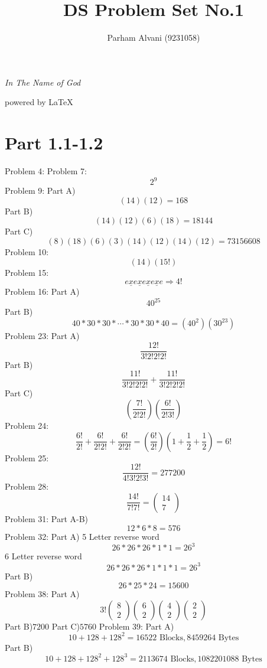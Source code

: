 \documentclass{article}
\title{DS Problem Set No.1}
\author{Parham Alvani (9231058)}
\begin{document}
\begin{titlepage}
\begin{center}
\emph{In The Name of God}
\end{center}
\maketitle
\begin{center}
powered by \LaTeX
\end{center}
\end{titlepage}
\tableofcontents
\newpage
\section{Part 1.1-1.2}
	Problem 4:
	Problem 7:
	$$
	2^9
	$$
	Problem 9: Part A)
	$$
	(14)(12)=168
	$$
	Part B)
	$$
	(14)(12)(6)(18)=18144
	$$
	Part C)
	$$
	(8)(18)(6)(3)(14)(12)(14)(12)=73156608
	$$
	Problem 10:
	$$
	(14)(15!)
	$$
	Problem 15:
	$$
	e\underline{x}e\underline{x}e\underline{x}e\underline{x}e
	\Rightarrow
	4!
	$$
	Problem 16: Part A)
	$$
	40^{25}
	$$
	Part B)
	$$
	40 * 30 * 30 * \cdots * 30 * 30 * 40 = (40^2)(30^{23})
	$$
	Problem 23: Part A)
	$$
	\frac{12!}{3!2!2!2!}
	$$
	Part B)
	$$
	\frac{11!}{3!2!2!2!}
	+
	\frac{11!}{3!2!2!2!}
	$$
	Part C)
	$$
	\left(
	\frac{7!}{2!2!}
	\right)
	\left(
	\frac{6!}{2!3!}
	\right)
	$$
	Problem 24:
	$$
	\frac{6!}{2!}
	+
	\frac{6!}{2!2!}
	+
	\frac{6!}{2!2!}
	=
	\left(
	\frac{6!}{2!}
	\right)
	\left(
	1
	+
	\frac{1}{2}
	+
	\frac{1}{2}
	\right)
	=6!
	$$
	Problem 25:
	$$
	\frac{12!}{4!3!2!3!}=277200
	$$
	Problem 28:
	$$
	\frac{14!}{7!7!}
	=
	\left(\begin{array}{c}
	14\\
	7
	\end{array}\right)	
	$$
	Problem 31:
	Part A-B)
	$$
	12*6*8=576	
	$$
	Problem 32: Part A) 5 Letter reverse word	
	$$
	26*26*26*1*1=26^3
	$$
	6 Letter reverse word
	$$
	26*26*26*1*1*1=26^3
	$$
	Part B)
	$$
	26*25*24=15600
	$$
	Problem 38: Part A)
	$$
	3!
	\left(\begin{array}{c}
	8\\
	2
	\end{array}\right)
	\left(\begin{array}{c}
	6\\
	2
	\end{array}\right)
	\left(\begin{array}{c}
	4\\
	2
	\end{array}\right)
	\left(\begin{array}{c}
	2\\
	2
	\end{array}\right)
	$$
	Part B)$ 7200 $
	\newline
	Part C)$ 5760 $
	\newline
	Problem 39: Part A)
	$$
	10 + 128 + 128^2 = 16522 \mbox{ Blocks}
	,
	8459264 \mbox{ Bytes}
	$$
	Part B)
	$$
	10 + 128 + 128^2 + 128^3 = 2113674 \mbox{ Blocks}
	,
	1082201088 \mbox{ Bytes}
	$$
\end{document}
